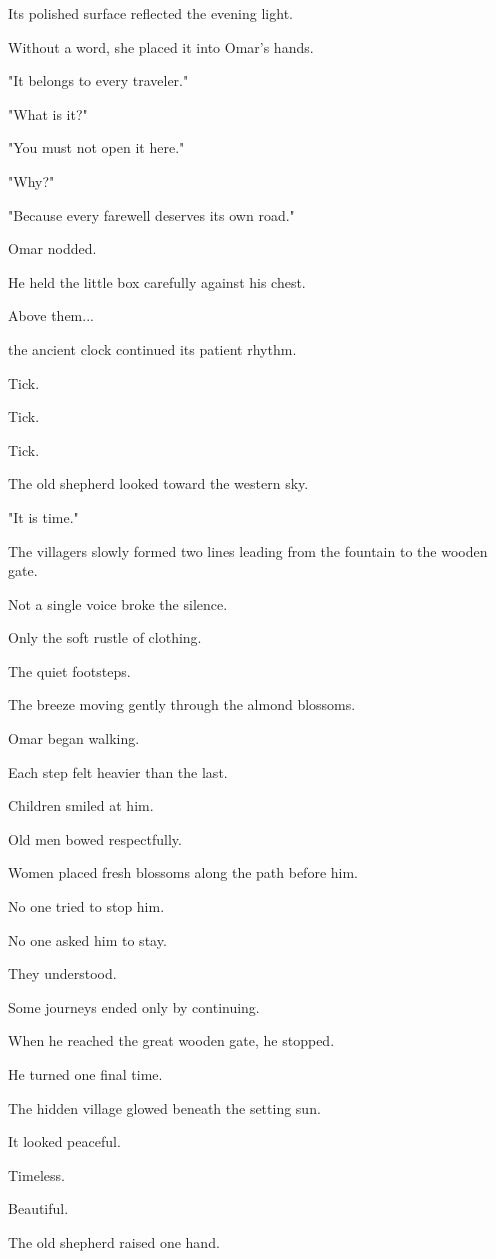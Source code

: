 \documentclass[12pt,openany]{book}
\begin{document}
Its polished surface reflected the evening light.

Without a word, she placed it into Omar's hands.

"It belongs to every traveler."

"What is it?"

"You must not open it here."

"Why?"

"Because every farewell deserves its own road."

Omar nodded.

He held the little box carefully against his chest.

Above them...

the ancient clock continued its patient rhythm.

Tick.

Tick.

Tick.

The old shepherd looked toward the western sky.

"It is time."

The villagers slowly formed two lines leading from the fountain to the wooden gate.

Not a single voice broke the silence.

Only the soft rustle of clothing.

The quiet footsteps.

The breeze moving gently through the almond blossoms.

Omar began walking.

Each step felt heavier than the last.

Children smiled at him.

Old men bowed respectfully.

Women placed fresh blossoms along the path before him.

No one tried to stop him.

No one asked him to stay.

They understood.

Some journeys ended only by continuing.

When he reached the great wooden gate, he stopped.

He turned one final time.

The hidden village glowed beneath the setting sun.

It looked peaceful.

Timeless.

Beautiful.

The old shepherd raised one hand.
\end{document}
